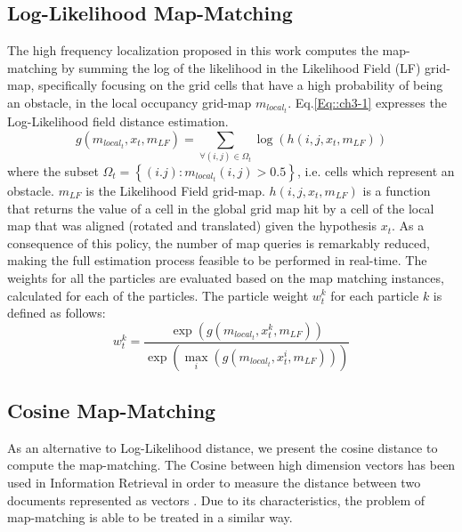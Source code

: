 \subsection{Log-Likelihood Map-Matching}

The high frequency localization proposed in this work computes the map-matching by summing the log of the likelihood in the Likelihood Field (LF) grid-map, specifically focusing on the grid cells that have a high probability of being an obstacle, in the local occupancy grid-map $m_{local_{t}}$. Eq.\ref{Eq::ch3-1} expresses the Log-Likelihood field distance estimation.
\begin{equation}
\label{Eq::ch3-1}
g(m_{local_{t}},x_t,m_{LF}) = \sum_{\forall(i,j)\in \Omega_t} \log(h(i,j,x_t,m_{LF}))
\end{equation}
where the subset $\Omega_t=\left\lbrace (i.j) \colon m_{local_{t}} (i,j)>0.5\right\rbrace $, i.e. cells which represent an obstacle. $m_{LF}$  is the Likelihood Field grid-map. $h(i,j,x_t,m_{LF})$  is a function that returns the value of a cell in the global grid map hit by a cell of the local map that was aligned (rotated and translated) given the hypothesis $x_t$. As a consequence of this policy, the number of map queries is remarkably reduced, making the full estimation process feasible to be performed in real-time. The weights for all the particles are evaluated based on the map matching instances, calculated for each of the particles. The particle weight $w_t^k$ for each particle $k$ is defined as follows:
\begin{equation}
\label{Eq::ch3-3}
w_t^k = \frac{\exp(g(m_{local_{t}},x_t^k,m_{LF}))}{\exp(\max_{i}(g(m_{local_{t}},x_t^i,m_{LF})))}
\end{equation}

\subsection{Cosine Map-Matching}

As an alternative to Log-Likelihood distance, we present the cosine distance to compute the map-matching. The Cosine between high dimension vectors has been used in Information Retrieval in order to measure the distance between two documents represented as vectors \cite{23baeza1999modern}. Due to its characteristics, the problem of map-matching is able to be treated in a similar way.

